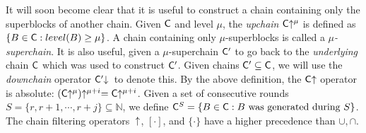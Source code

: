 It will soon become clear that it is useful to construct a chain containing only
the superblocks of another chain. Given $\mathsf{C}$ and level $\mu$, the
\emph{upchain} $\mathsf{C}\negthickspace\uparrow^\mu$ is defined as $\{B \in \mathsf{C}: level(B)
\geq \mu\}$. A chain containing only $\mu$-superblocks is called a
$\mu$\emph{-superchain}. It is also useful, given a $\mu$-superchain $\mathsf{C}'$
to go back to the \emph{underlying} chain $\mathsf{C}$ which was used to construct
$\mathsf{C}'$. Given chains $\mathsf{C}' \subseteq
\mathsf{C}$, we will use the \emph{downchain} operator $\mathsf{C}'\negthickspace\downarrow\,$ to denote
this.
By the above definition, the $\mathsf{C}\negthickspace\uparrow$
operator is absolute: $(\mathsf{C}\negthickspace\uparrow^\mu)\negthickspace\uparrow^{\mu + i} =
\mathsf{C}\negthickspace\uparrow^{\mu + i}$. Given a set of consecutive rounds $S = \{r, r + 1,
\cdots, r + j\} \subseteq \mathbb{N}$, we define $\mathsf{C}^S = \{B \in \mathsf{C}: B
\text{ was generated during } S\}$. The chain filtering operators~
$\negthickspace\uparrow$, $[\cdot]$, and $\{\cdot\}$ have a higher precedence than
$\cup, \cap$.
